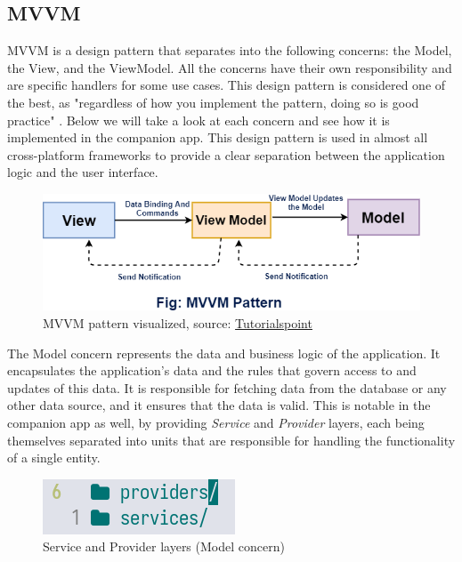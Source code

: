 \subsection{MVVM}
\par
MVVM is a design pattern that separates into the following concerns: the Model, the View, and the ViewModel. 
All the concerns have their own responsibility and are specific handlers for some use cases.
This design pattern is considered one of the best, as "regardless of how you implement the pattern, doing so is good practice" \cite{mvvmQ}.
Below we will take a look at each concern and see how it is implemented in the companion app.
This design pattern is used in almost all cross-platform frameworks to provide a clear separation between the application logic and the user interface.
\begin{figure}[htbp]
    \centering
    \includegraphics[scale=0.7]{pictures/mvvm.png}
    \caption{MVVM pattern visualized, source: \href{https://www.javatpoint.com/xamarin-model-view-viewmodel-pattern}{Tutorialspoint}}
    \label{mvvmExample}
\end{figure}
\par
The Model concern represents the data and business logic of the application. 
It encapsulates the application's data and the rules that govern access to and updates of this data. 
It is responsible for fetching data from the database or any other data source, and it ensures that the data is valid. 
This is notable in the companion app as well, by providing \textit{Service} and \textit{Provider} layers, 
each being themselves separated into units that are responsible for handling the functionality of a single entity.
\begin{figure}[htbp]
    \centering
    \includegraphics[scale=1.0]{pictures/service_provider.png}
    \caption{Service and Provider layers (Model concern)}
    \label{serviceProviderExample}
\end{figure}
